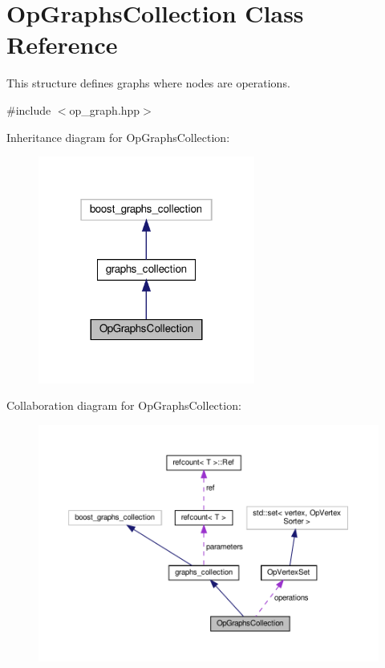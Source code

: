 \hypertarget{classOpGraphsCollection}{}\section{Op\+Graphs\+Collection Class Reference}
\label{classOpGraphsCollection}


This structure defines graphs where nodes are operations.  




{\ttfamily \#include $<$op\+\_\+graph.\+hpp$>$}



Inheritance diagram for Op\+Graphs\+Collection\+:
\nopagebreak
\begin{figure}[H]
\begin{center}
\leavevmode
\includegraphics[width=202pt]{d4/d1c/classOpGraphsCollection__inherit__graph}
\end{center}
\end{figure}


Collaboration diagram for Op\+Graphs\+Collection\+:
\nopagebreak
\begin{figure}[H]
\begin{center}
\leavevmode
\includegraphics[width=350pt]{d0/de6/classOpGraphsCollection__coll__graph}
\end{center}
\end{figure}
